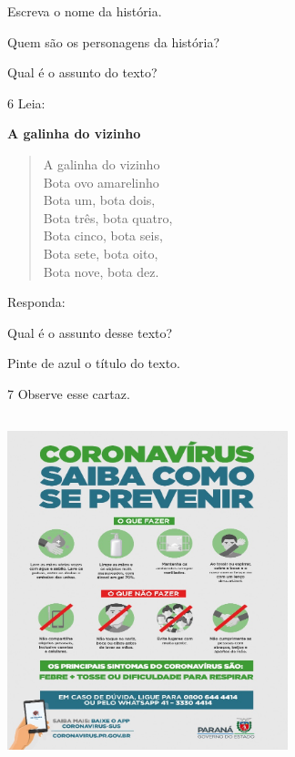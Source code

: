 
\begin{escolha}
\item Escreva o nome da história.


\item Quem são os personagens da história?


\item Qual é o assunto do texto?

\end{escolha}

\num{6} Leia:

\textbf{A galinha do vizinho}

\begin{verse}
A galinha do vizinho\\
Bota ovo amarelinho\\
Bota um, bota dois,\\
Bota três, bota quatro,\\
Bota cinco, bota seis,\\
Bota sete, bota oito,\\
Bota nove, bota dez.
\end{verse}

Responda:

\begin{escolha}
\item Qual é o assunto desse texto?


\item Pinte de azul o título do texto.
\end{escolha}

\num{7} Observe esse cartaz.


\includegraphics[width=3.20896in,height=3.98057in]{media/image120.jpeg}

